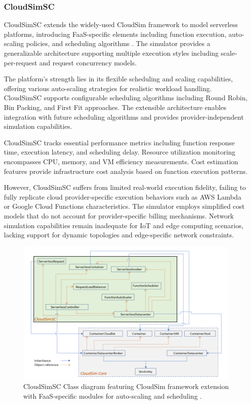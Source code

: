 \subsubsection{CloudSimSC}


CloudSimSC extends the widely-used CloudSim framework to model serverless platforms, introducing FaaS-specific elements including function execution, auto-scaling policies, and scheduling algorithms \cite{mampage2021cloudsimsc}. The simulator provides a generalizable architecture supporting multiple execution styles including scale-per-request and request concurrency models.

The platform's strength lies in its flexible scheduling and scaling capabilities, offering various auto-scaling strategies for realistic workload handling. CloudSimSC supports configurable scheduling algorithms including Round Robin, Bin Packing, and First Fit approaches. The extensible architecture enables integration with future scheduling algorithms and provides provider-independent simulation capabilities.

CloudSimSC tracks essential performance metrics including function response time, execution latency, and scheduling delay. Resource utilization monitoring encompasses CPU, memory, and VM efficiency measurements. Cost estimation features provide infrastructure cost analysis based on function execution patterns.

However, CloudSimSC suffers from limited real-world execution fidelity, failing to fully replicate cloud provider-specific execution behaviors such as AWS Lambda or Google Cloud Functions characteristics. The simulator employs simplified cost models that do not account for provider-specific billing mechanisms. Network simulation capabilities remain inadequate for IoT and edge computing scenarios, lacking support for dynamic topologies and edge-specific network constraints.

\begin{figure}[htbp]
\centering
\includegraphics[width=1\textwidth]{Assets/cloudsimcs.png}
\caption{CloudSimSC Class diagram featuring CloudSim framework extension with FaaS-specific modules for auto-scaling and scheduling \cite{mampage2021cloudsimsc}.}
\label{fig:cloudsimsc-architecture}
\end{figure}

